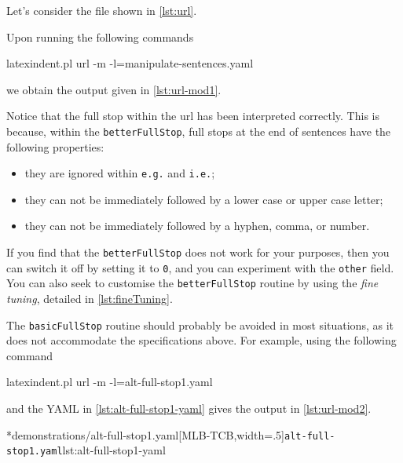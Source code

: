 	Let's consider the file shown in \cref{lst:url}.


	Upon running the following commands
	\begin{commandshell}
latexindent.pl url -m -l=manipulate-sentences.yaml
\end{commandshell}
	we obtain the output given in \cref{lst:url-mod1}.


	Notice that the full stop within the url has been interpreted correctly. This is because,
	within the \texttt{betterFullStop}, full stops at the end of sentences have the
	following properties:
	\begin{itemize}
		\item they are ignored within \texttt{e.g.} and \texttt{i.e.};
		\item they can not be immediately followed by a lower case or upper case letter;
		\item they can not be immediately followed by a hyphen, comma, or number.
	\end{itemize}
	If you find that the \texttt{betterFullStop} does not work for your purposes, then
	you can switch it off by setting it to \texttt{0}, and you can
	experiment with the \texttt{other}
	field.%
	 You can also seek
	to customise the \texttt{betterFullStop} routine by using the
	\emph{fine tuning}, detailed in \vref{lst:fineTuning}.

	The \texttt{basicFullStop} routine should probably be avoided in most situations, as
	it does not accommodate the specifications above. For example, using the following
	command
	\begin{commandshell}
latexindent.pl url -m -l=alt-full-stop1.yaml
\end{commandshell}
	and the YAML in \cref{lst:alt-full-stop1-yaml} gives the output in
	\cref{lst:url-mod2}.

	\begin{cmhtcbraster}[ raster left skip=-3.5cm,
			raster right skip=-2cm,
			raster force size=false,
			raster column 1/.style={add to width=.1\textwidth},
			raster column skip=.06\linewidth]
		\cmhlistingsfromfile[style=yaml-LST]*{demonstrations/alt-full-stop1.yaml}[MLB-TCB,width=.5\textwidth]{\texttt{alt-full-stop1.yaml}}{lst:alt-full-stop1-yaml}
	\end{cmhtcbraster}

